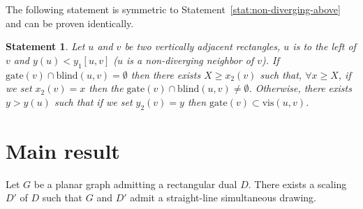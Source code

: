 \documentclass{llncs}
\newtheorem{statement}{Statement}
\newcommand{\gate}{\textrm{gate}}
\newcommand{\vis}{\textrm{vis}}
\newcommand{\blind}{\textrm{blind}}
\begin{document}
The  following statement is symmetric to Statement~\ref{stat:non-diverging-above} and can be proven identically.
\begin{statement}
\label{stat:non-diverging-below}
Let $u$ and $v$ be two vertically adjacent rectangles, $u$ is to the left of $v$ and $y(u) < y_1[u,v]$  ($u$ is a non-diverging neighbor of $v$). If $\gate(v) \cap \blind(u,v) = \emptyset$ then  there exists $X \geq x_2(v)$ such that, $\forall x\geq X$,  if we set $x_2(v) = x$  then the $\gate(v) \cap \blind(u,v) \neq \emptyset$.  Otherwise, there exists $y>y(u)$ such that if we set $y_2(v)=y$ then $\gate(v) \subset \vis(u,v)$.
\end{statement}







\section{Main result}
\label{sec:main}

\begin{theorem}
Let $G$ be a planar graph admitting a rectangular dual $D$. There exists a scaling $D'$ of $D$ such that $G$ and $D'$ admit a  straight-line simultaneous drawing.
\end{theorem}
\end{document}
